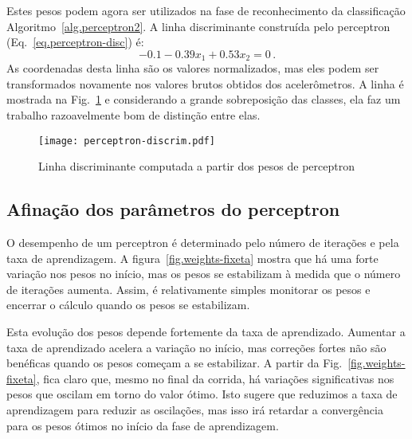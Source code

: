 Estes pesos podem agora ser utilizados na fase de reconhecimento da classificação Algoritmo~\ref{alg.perceptron2}. A linha discriminante construída pelo perceptron (Eq.~\ref{eq.perceptron-disc}) é:
\[
-0.1 -0.39x_1 + 0.53x_2 = 0\,.
\]
As coordenadas desta linha são os valores normalizados, mas eles podem ser transformados novamente nos valores brutos obtidos dos acelerômetros. A linha é mostrada na Fig.~\ref{fig.perceptron-dis} e considerando a grande sobreposição das classes, ela faz um trabalho razoavelmente bom de distinção entre elas.

\begin{figure}
\begin{center}
\texttt{[image: perceptron-discrim.pdf]}
\end{center}
\caption{Linha discriminante computada a partir dos pesos de perceptron}\label{fig.perceptron-dis}
\end{figure}

\subsection{Afinação dos parâmetros do perceptron}

O desempenho de um perceptron é determinado pelo número de iterações e pela taxa de aprendizagem. A figura~\ref{fig.weights-fixeta} mostra que há uma forte variação nos pesos no início, mas os pesos se estabilizam à medida que o número de iterações aumenta. Assim, é relativamente simples monitorar os pesos e encerrar o cálculo quando os pesos se estabilizam.

Esta evolução dos pesos depende fortemente da taxa de aprendizado. Aumentar a taxa de aprendizado acelera a variação no início, mas correções fortes não são benéficas quando os pesos começam a se estabilizar. A partir da Fig.~\ref{fig.weights-fixeta}, fica claro que, mesmo no final da corrida, há variações significativas nos pesos que oscilam em torno do valor ótimo. Isto sugere que reduzimos a taxa de aprendizagem para reduzir as oscilações, mas isso irá retardar a convergência para os pesos ótimos no início da fase de aprendizagem.

